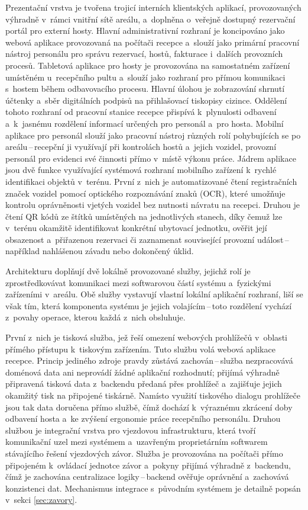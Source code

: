 Prezentační vrstva je tvořena trojicí interních klientských aplikací, provozovaných výhradně v~rámci vnitřní sítě areálu, a~doplněna o~veřejně dostupný rezervační portál pro externí hosty.
Hlavní administrativní rozhraní je koncipováno jako webová aplikace provozovaná na počítači recepce a~slouží jako primární pracovní nástroj personálu pro správu rezervací, hostů, fakturace i~dalších provozních procesů.
Tabletová aplikace pro hosty je provozována na samostatném zařízení umístěném u~recepčního pultu a~slouží jako rozhraní pro přímou komunikaci s~hostem během odbavovacího procesu.
Hlavní úlohou je zobrazování shrnutí účtenky a~sběr digitálních podpisů na přihlašovací tiskopisy cizince.
Oddělení tohoto rozhraní od pracovní stanice recepce přispívá k~plynulosti odbavení a~k~jasnému rozdělení informací určených pro personál a~pro hosta.
Mobilní aplikace pro personál slouží jako pracovní nástroj různých rolí pohybujících se po areálu\,--\,recepční ji využívají při kontrolách hostů a~jejich vozidel, provozní personál pro evidenci své činnosti přímo v~místě výkonu práce.
Jádrem aplikace jsou dvě funkce využívající systémová rozhraní mobilního zařízení k~rychlé identifikaci objektů v~terénu.
První z~nich je automatizované čtení registračních značek vozidel pomocí optického rozpoznávání znaků (OCR), které umožňuje kontrolu oprávněnosti vjetých vozidel bez nutnosti návratu na recepci.
Druhou je čtení QR kódů ze štítků umístěných na jednotlivých stanech, díky čemuž lze v~terénu okamžitě identifikovat konkrétní ubytovací jednotku, ověřit její obsazenost a~přiřazenou rezervaci či zaznamenat související provozní událost\,--\,například nahlášenou závadu nebo dokončený úklid.

Architekturu doplňují dvě lokálně provozované služby, jejichž rolí je zprostředkovávat komunikaci mezi softwarovou částí systému a~fyzickými zařízeními v~areálu.
Obě služby vystavují vlastní lokální aplikační rozhraní, liší se však tím, která komponenta systému je jejich volajícím\,--\,toto rozdělení vychází z~povahy operace, kterou každá z~nich obsluhuje.

První z~nich je tisková služba, jež řeší omezení webových prohlížečů v~oblasti přímého přístupu k~tiskovým zařízením.
Tuto službu volá webová aplikace recepce.
Princip jediného zdroje pravdy zůstává zachován\,--\,služba nezpracovává doménová data ani neprovádí žádné aplikační rozhodnutí; přijímá výhradně připravená tisková data z~backendu předaná přes prohlížeč a~zajišťuje jejich okamžitý tisk na připojené tiskárně.
Namísto využití tiskového dialogu prohlížeče jsou tak data doručena přímo službě, čímž dochází k~výraznému zkrácení doby odbavení hosta a~ke zvýšení ergonomie práce recepčního personálu.
Druhou službou je integrační vrstva pro vjezdovou infrastrukturu, která tvoří komunikační uzel mezi systémem a~uzavřeným proprietárním softwarem stávajícího řešení vjezdových závor.
Služba je provozována na počítači přímo připojeném k~ovládací jednotce závor a~pokyny přijímá výhradně z~backendu, čímž je zachována centralizace logiky\,--\,backend ověřuje oprávnění a~zachovává konzistenci dat.
Mechanismus integrace s~původním systémem je detailně popsán v~sekci \ref{sec:zavory}.

